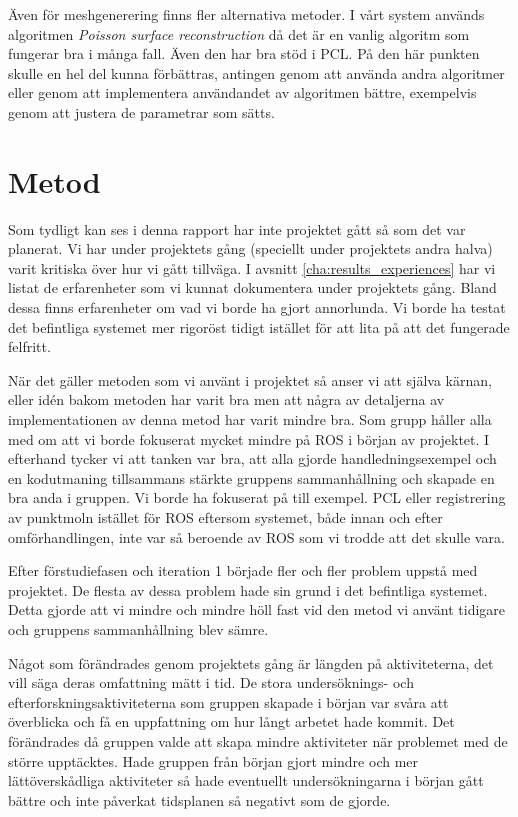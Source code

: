 Även för meshgenerering finns fler alternativa metoder. I vårt system används algoritmen \textit{Poisson surface reconstruction} då det är en vanlig algoritm som fungerar bra i många fall. Även den har bra stöd i PCL. På den här punkten skulle en hel del kunna förbättras, antingen genom att använda andra algoritmer eller genom att implementera användandet av algoritmen bättre, exempelvis genom att justera de parametrar som sätts.


\section{Metod}
\label{sec:discussion-method}
Som tydligt kan ses i denna rapport har inte projektet gått så som det var planerat. Vi har under projektets gång (speciellt under projektets andra halva) varit kritiska över hur vi gått tillväga. I avsnitt \ref{cha:results_experiences} har vi listat de erfarenheter som vi kunnat dokumentera under projektets gång. Bland dessa finns erfarenheter om vad vi borde ha gjort annorlunda. Vi borde ha testat det befintliga systemet mer rigoröst tidigt istället för att lita på att det fungerade felfritt.

När det gäller metoden som vi använt i projektet så anser vi att själva kärnan, eller idén bakom metoden har varit bra men att några av detaljerna av implementationen av denna metod har varit mindre bra. Som grupp håller alla med om att vi borde fokuserat mycket mindre på ROS i början av projektet. I efterhand tycker vi att tanken var bra, att alla gjorde handledningsexempel och en kodutmaning tillsammans stärkte gruppens sammanhållning och skapade en bra anda i gruppen. Vi borde ha fokuserat på till exempel. PCL eller registrering av punktmoln istället för ROS eftersom systemet, både innan och efter omförhandlingen, inte var så beroende av ROS som vi trodde att det skulle vara.

Efter förstudiefasen och iteration 1 började fler och fler problem uppstå med projektet. De flesta av dessa problem hade sin grund i det befintliga systemet. Detta gjorde att vi mindre och mindre höll fast vid den metod vi använt tidigare och gruppens sammanhållning blev sämre.

Något som förändrades genom projektets gång är längden på aktiviteterna, det vill säga deras omfattning mätt i tid. De stora undersöknings- och efterforskningsaktiviteterna som gruppen skapade i början var svåra att överblicka och få en uppfattning om hur långt arbetet hade kommit. Det förändrades då gruppen valde att skapa mindre aktiviteter när problemet med de större upptäcktes. Hade gruppen från början gjort mindre och mer lättöverskådliga aktiviteter så hade eventuellt undersökningarna i början gått bättre och inte påverkat tidsplanen så negativt som de gjorde.

